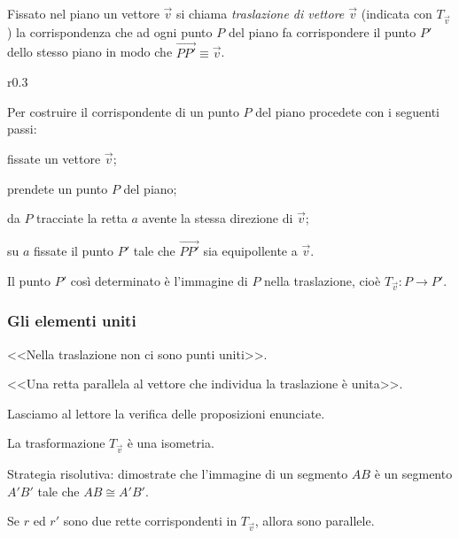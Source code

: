 \begin{definizione}
Fissato nel piano un vettore $\vec{v}$ si chiama \emph{traslazione di 
vettore $\vec{v}$} (indicata con $T_{\vec{v}}$) la corrispondenza che 
ad ogni punto $P$ del piano fa corrispondere il punto $P'$ dello 
stesso piano in modo che 
$\overset{\longrightarrow}{PP'}\equiv\vec{v}$.
\end{definizione}

\setlength{\intextsep}{3pt plus 2.0pt minus 2.0pt}
\begin{wrapfigure}{r}{0.3\textwidth}
	\centering
\end{wrapfigure}
Per costruire il corrispondente di un punto $P$ del piano procedete 
con i seguenti passi:
\begin{enumerate*}
\item fissate un vettore $\vec{v}$;
\item prendete un punto $P$ del piano;
\item da $P$ tracciate la retta $a$ avente la stessa direzione di 
$\vec{v}$;
\item su $a$ fissate il punto $P'$ tale che $\overrightarrow{PP'}$ 
sia equipollente a $\vec{v}$.
\end{enumerate*}
Il punto $P'$ così determinato è l'immagine di $P$ nella traslazione, 
cioè $T_{\vec{v}}:P\rightarrow P'$.

\subsubsection{Gli elementi uniti}

\begin{itemize*}
\item <<Nella traslazione non ci sono punti uniti>>.
\item <<Una retta parallela al vettore che individua la traslazione è 
unita>>.
\end{itemize*}

Lasciamo al lettore la verifica delle proposizioni enunciate.

\begin{teorema}
La trasformazione $T_{\vec{v}}$ è una isometria.
\end{teorema}

Strategia risolutiva: dimostrate che l'immagine di un segmento $AB$ è 
un segmento $A'B'$ tale che $AB\cong A'B'$.

\begin{teorema}
Se $r$ ed $r'$ sono due rette corrispondenti in $T_{\vec{v}}$, allora 
sono parallele.
\end{teorema}

